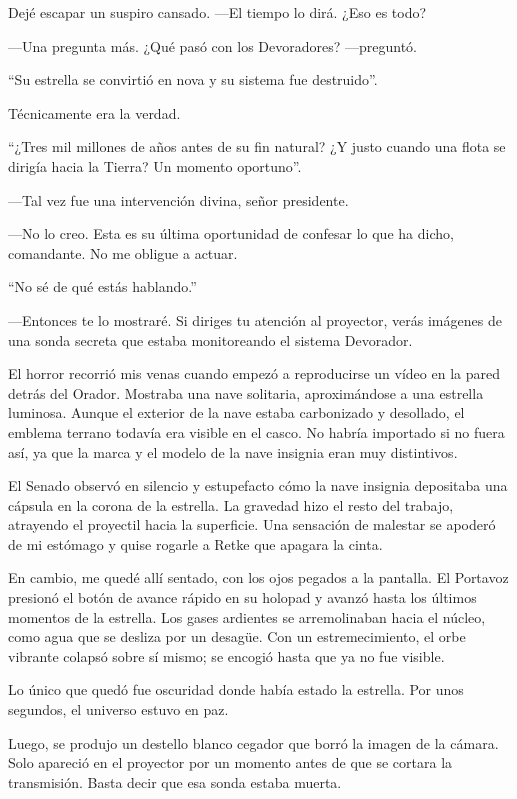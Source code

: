 Dejé escapar un suspiro cansado. —El tiempo lo dirá. ¿Eso es todo?

—Una pregunta más. ¿Qué pasó con los Devoradores? —preguntó.

``Su estrella se convirtió en nova y su sistema fue destruido''.

Técnicamente era la verdad.

``¿Tres mil millones de años antes de su fin natural? ¿Y justo cuando una flota se dirigía hacia la Tierra? Un momento oportuno''.

—Tal vez fue una intervención divina, señor presidente.

—No lo creo. Esta es su última oportunidad de confesar lo que ha dicho, comandante. No me obligue a actuar.

``No sé de qué estás hablando.''

—Entonces te lo mostraré. Si diriges tu atención al proyector, verás imágenes de una sonda secreta que estaba monitoreando el sistema Devorador.

El horror recorrió mis venas cuando empezó a reproducirse un vídeo en la pared detrás del Orador. Mostraba una nave solitaria, aproximándose a una estrella luminosa. Aunque el exterior de la nave estaba carbonizado y desollado, el emblema terrano todavía era visible en el casco. No habría importado si no fuera así, ya que la marca y el modelo de la nave insignia eran muy distintivos.

El Senado observó en silencio y estupefacto cómo la nave insignia depositaba una cápsula en la corona de la estrella. La gravedad hizo el resto del trabajo, atrayendo el proyectil hacia la superficie. Una sensación de malestar se apoderó de mi estómago y quise rogarle a Retke que apagara la cinta.

En cambio, me quedé allí sentado, con los ojos pegados a la pantalla. El Portavoz presionó el botón de avance rápido en su holopad y avanzó hasta los últimos momentos de la estrella. Los gases ardientes se arremolinaban hacia el núcleo, como agua que se desliza por un desagüe. Con un estremecimiento, el orbe vibrante colapsó sobre sí mismo; se encogió hasta que ya no fue visible.

Lo único que quedó fue oscuridad donde había estado la estrella. Por unos segundos, el universo estuvo en paz.

Luego, se produjo un destello blanco cegador que borró la imagen de la cámara. Solo apareció en el proyector por un momento antes de que se cortara la transmisión. Basta decir que esa sonda estaba muerta.

